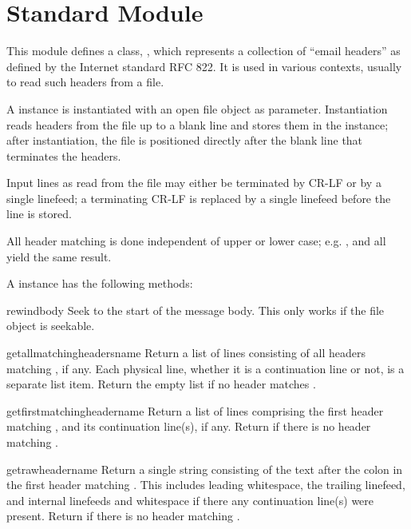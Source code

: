 \section{Standard Module }

\renewcommand{\indexsubitem}{(in module rfc822)}

This module defines a class, , which represents a
collection of ``email headers'' as defined by the Internet standard
RFC 822.  It is used in various contexts, usually to read such headers
from a file.

A  instance is instantiated with an open file object as
parameter.  Instantiation reads headers from the file up to a blank
line and stores them in the instance; after instantiation, the file is
positioned directly after the blank line that terminates the headers.

Input lines as read from the file may either be terminated by CR-LF or
by a single linefeed; a terminating CR-LF is replaced by a single
linefeed before the line is stored.

All header matching is done independent of upper or lower case;
e.g. ,  and  all yield
the same result.

A  instance has the following methods:

\begin{funcdesc}{rewindbody}{}
Seek to the start of the message body.  This only works if the file
object is seekable.
\end{funcdesc}

\begin{funcdesc}{getallmatchingheaders}{name}
Return a list of lines consisting of all headers matching
, if any.  Each physical line, whether it is a continuation
line or not, is a separate list item.  Return the empty list if no
header matches .
\end{funcdesc}

\begin{funcdesc}{getfirstmatchingheader}{name}
Return a list of lines comprising the first header matching
, and its continuation line(s), if any.  Return 
if there is no header matching .
\end{funcdesc}

\begin{funcdesc}{getrawheader}{name}
Return a single string consisting of the text after the colon in the
first header matching .  This includes leading whitespace,
the trailing linefeed, and internal linefeeds and whitespace if there
any continuation line(s) were present.  Return  if there is
no header matching .
\end{funcdesc}

